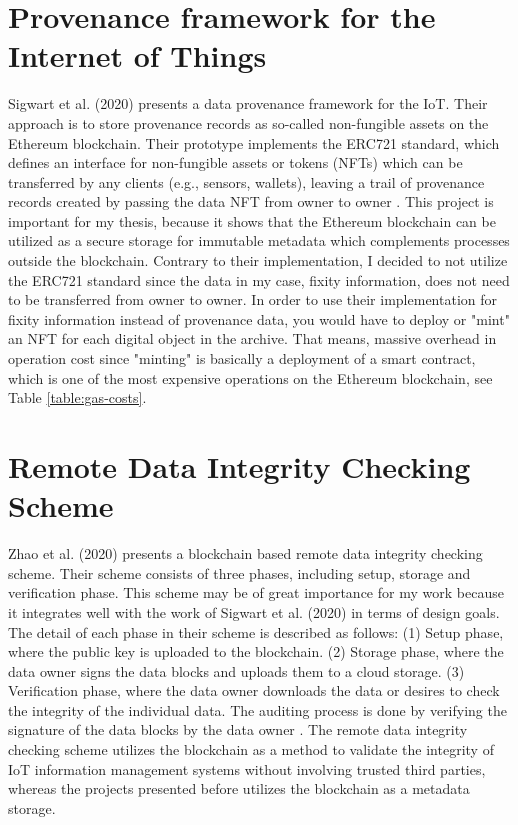 \section{Provenance framework for the Internet of Things}
Sigwart et al. (2020) presents a data provenance framework for the IoT. Their approach is to store provenance records as so-called non-fungible assets on the Ethereum blockchain. Their prototype implements the ERC721 standard, which defines an interface for non-fungible assets or tokens (NFTs) which can be transferred by any clients (e.g., sensors, wallets), leaving a trail of provenance records created by passing the data NFT from owner to owner \cite[7]{Sigwart2020}. 
This project is important for my thesis, because it shows that the Ethereum blockchain can be utilized as a secure storage for immutable metadata which complements processes outside the blockchain.
Contrary to their implementation, I decided to not utilize the ERC721 standard since the data in my case, fixity information, does not need to be transferred from owner to owner. In order to use their implementation for fixity information instead of provenance data, you would have to deploy or "mint" an NFT for each digital object in the archive. That means, massive overhead in operation cost since "minting" is basically a deployment of a smart contract, which is one of the most expensive operations on the Ethereum blockchain, see Table \ref{table:gas-costs}.

\section{Remote Data Integrity Checking Scheme}
Zhao et al. (2020) presents a blockchain based remote data integrity checking scheme. Their scheme consists of three phases, including setup, storage and verification phase. This scheme may be of great importance for my work because it integrates well with the work of Sigwart et al. (2020) in terms of design goals. The detail of each phase in their scheme is described as follows: (1) Setup phase, where the public key is uploaded to the blockchain. (2) Storage phase, where the data owner signs the data blocks and uploads them to a cloud storage. (3) Verification phase, where the data owner downloads the data or desires to check the integrity of the individual data. The auditing process is done by verifying the signature of the data blocks by the data owner \cite[1]{zhao2020blockchain}.
The remote data integrity checking scheme utilizes the blockchain as a method to validate the integrity of IoT information management systems without involving trusted third parties, whereas the projects presented before utilizes the blockchain as a metadata storage.


